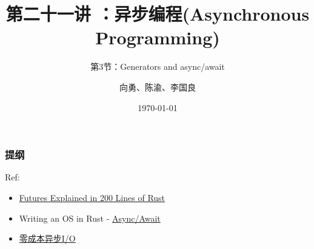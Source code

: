 


\title[第21讲]{第二十一讲 ：异步编程(Asynchronous Programming)} %
\subtitle{第3节：Generators and async/await}
\author{向勇、陈渝、李国良} %
\date{\today} %



\begin{frame}
\titlepage %
\end{frame}

\begin{frame}
\frametitle{提纲} %
\tableofcontents %
Ref:
    \begin{itemize}
        \item \href{https://cfsamson.github.io/books-futures-explained/}{Futures Explained in 200 Lines of Rust}
        \item Writing an OS in Rust - \href{https://os.phil-opp.com/async-await/}{Async/Await}
        \item \href{https://zhuanlan.zhihu.com/p/97574385}{零成本异步I/O}
    \end{itemize}

\end{frame}
% 
% 
